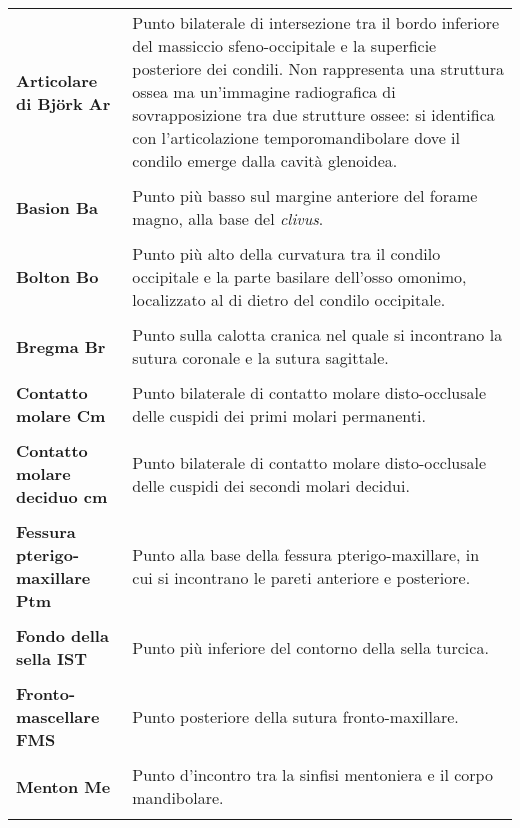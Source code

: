 \footnotesize
\begin{longtable}{>{\bfseries}p{5cm}X}
Articolare di Björk \newline Ar & Punto bilaterale di intersezione tra il bordo inferiore del massiccio sfeno-occipitale e la superficie posteriore dei condili. Non rappresenta una struttura ossea ma un'immagine radiografica di sovrapposizione tra due strutture ossee: si identifica con l'articolazione temporomandibolare dove il condilo emerge dalla cavità glenoidea.\\\\
Basion \newline Ba & Punto più basso sul margine anteriore del forame magno, alla base del \textit{clivus}.\\\\
Bolton \newline Bo & Punto più alto della curvatura tra il condilo occipitale e la parte basilare dell'osso omonimo, localizzato al di dietro del condilo occipitale.\\\\
Bregma \newline Br & Punto sulla calotta cranica nel quale si incontrano la sutura coronale e la sutura sagittale.\\\\
Contatto molare \newline Cm & Punto bilaterale di contatto molare disto-occlusale delle cuspidi dei primi molari permanenti.\\\\
Contatto molare deciduo \newline cm & Punto bilaterale di contatto molare disto-occlusale delle cuspidi dei secondi molari decidui.\\\\
Fessura pterigo-maxillare \newline Ptm & Punto alla base della fessura pterigo-maxillare, in cui si incontrano le pareti anteriore e posteriore.\\\\
Fondo della sella \newline IST & Punto più inferiore del contorno della sella turcica.\\\\
Fronto-mascellare \newline FMS & Punto posteriore della sutura fronto-maxillare.\\\\
Menton \newline Me & Punto d'incontro tra la sinfisi mentoniera e il corpo mandibolare.\\\\

\end{longtable}
